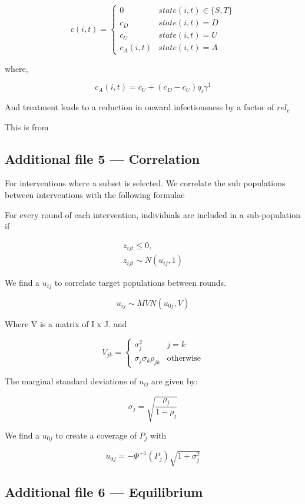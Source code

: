 \documentclass{bmcart}
\begin{document}
\begin{backmatter}
\[
c(i, t) =
\begin{cases} 
  0  & state(i, t) \in \{S, T\} \\
  c_D & state(i, t) = D \\
  c_U & state(i, t) = U \\
  c_A(i, t) & state(i, t) = A
\end{cases}
\]

where,

\[  c_A(i, t) = c_U + (c_D - c_U) q_i \gamma^1 \]

And treatment leads to a reduction in onward infectiousness by a factor of $rel_c$

This is from \cite{okell_contrasting_2014}

  \subsection*{Additional file 5 --- Correlation}

For interventions where a subset is selected. We correlate the sub populations between interventions with the following formulae

For every round of each intervention, individuals are included in a sub-population if

\begin{gather*}
    z_{ijt} \leq 0, \\
    z_{ijt} \sim N(u_{ij}, 1)
\end{gather*}

We find a $u_{ij}$ to correlate target populations between rounds.

\[u_{ij} \sim MVN(u_{0j}, V)\]

Where V is a matrix of I x J. and

\[
V_{jk} =
\begin{cases} 
  \sigma_j^2  & j = k \\
  \sigma_j\sigma_k\rho_{jk} & \text{otherwise}
\end{cases}
\]

The marginal standard deviations of $u_{ij}$ are given by:

\[\sigma_j = \sqrt{\frac{\rho_j}{1 - \rho_j}}\]

We find a $u_{0j}$ to create a coverage of $P_j$ with

\[ u_{0j} = -\Phi^{-1}(P_j)\sqrt{1 + \sigma_j^2} \]

  \subsection*{Additional file 6 --- Equilibrium}


\end{backmatter}
\end{document}
